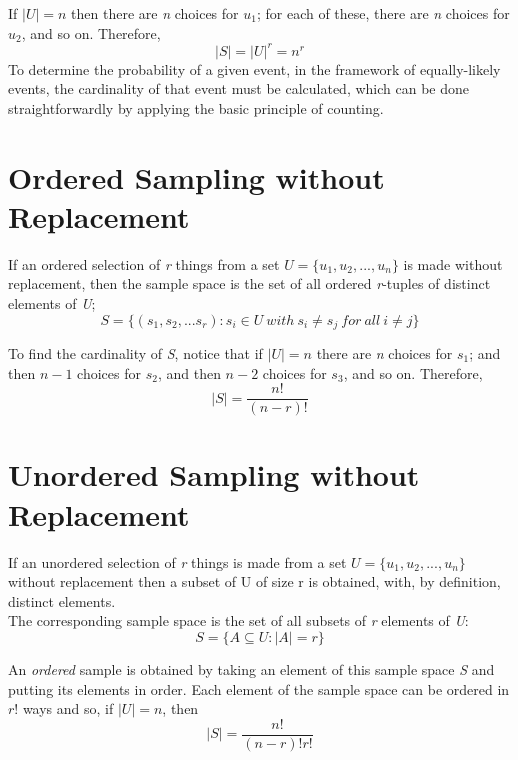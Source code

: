 \documentclass{report}
\begin{document}
If $|U| = n$ then there are \textit{n} choices for $u_1$; for each of these, there are \textit{n} choices for $u_2$, and so on. Therefore,
\begin{equation}
    |S| = |U|^r = n^r
\end{equation}
To determine the probability of a given event, in the framework of equally-likely events, the cardinality of that event must be calculated, which can be done straightforwardly by applying the basic principle of counting.

\section{Ordered Sampling without Replacement}

If an ordered selection of \textit{r} things from a set $U = \{ u_1,u_2,...,u_n \}$ is made without replacement, then the sample space is the set of all ordered \textit{r}-tuples of distinct elements of \textit{U};
\begin{equation}
    S = \{ (s_1,s_2,...s_r) : s_i \in U \:with\: s_i \neq s_j \: for\: all\: i \neq j \}
\end{equation}

To find the cardinality of \textit{S}, notice that if $|U| = n$ there are \textit{n} choices for $s_1$; and then $n - 1$ choices for $s_2$, and then $n - 2$ choices for $s_3$, and so on. Therefore,
\begin{equation}
    |S| = \frac{n!}{(n-r)!}
\end{equation}

\section{Unordered Sampling without Replacement}

If an unordered selection of \textit{r} things is made from a set $U = \{ u_1, u_2,...,u_n \}$ without replacement then a subset of U of size r is obtained, with, by definition, distinct elements.\\

The corresponding sample space is the set of all subsets of \textit{r} elements of \textit{U}:
\begin{equation}
    S = \{ A \subseteq U : |A| = r \}
\end{equation}

An \textit{ordered} sample is obtained by taking an element of this sample space \textit{S} and putting its elements in order. Each element of the sample space can be ordered in $r!$ ways and so, if $|U| = n$, then
\begin{equation}
|S| = \frac{n!}{(n-r)! r!}
\end{equation}
\end{document}

